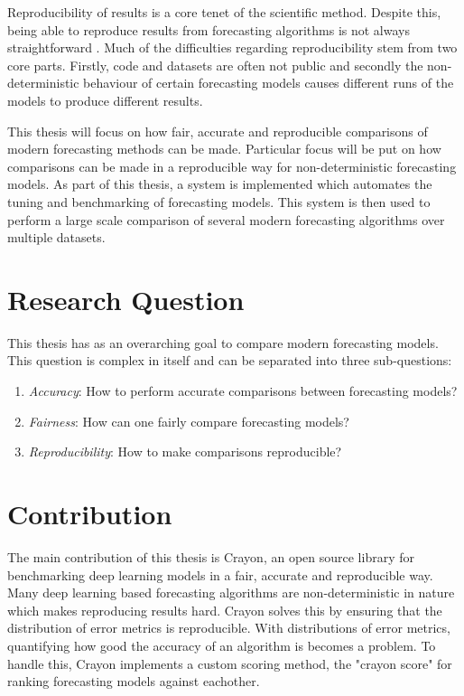 Reproducibility of results is a core tenet of the scientific method. Despite this, being able to reproduce results from forecasting algorithms is not always straightforward \cite{makridakis_m4_2020}. Much of the difficulties regarding reproducibility stem from two core parts. Firstly, code and datasets are often not public and secondly the non-deterministic behaviour of certain forecasting models causes different runs of the models to produce different results.

This thesis will focus on how fair, accurate and reproducible comparisons of modern forecasting methods can be made. Particular focus will be put on how comparisons can be made in a reproducible way for non-deterministic forecasting models. As part of this thesis, a system is implemented which automates the tuning and benchmarking of forecasting models. This system is then used to perform a large scale comparison of several modern forecasting algorithms over multiple datasets.

\section{Research Question}
This thesis has as an overarching goal to compare modern forecasting models. This question is complex in itself and can be separated into three sub-questions:

\begin{enumerate}
  \item \textit{Accuracy}: How to perform accurate comparisons between forecasting models?
  \item \textit{Fairness}: How can one fairly compare forecasting models?
  \item \textit{Reproducibility}: How to make comparisons reproducible?
\end{enumerate}

\section{Contribution}
\label{section:contribution}

The main contribution of this thesis is Crayon, an open source library for benchmarking deep learning models in a fair, accurate and reproducible way. Many deep learning based forecasting algorithms are non-deterministic in nature which makes reproducing results hard. Crayon solves this by ensuring that the distribution of error metrics is reproducible. With distributions of error metrics, quantifying how good the accuracy of an algorithm is becomes a problem. To handle this, Crayon implements a custom scoring method, the "crayon score" for ranking forecasting models against eachother.

